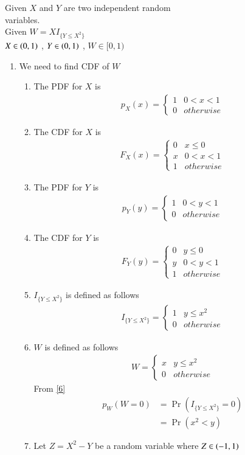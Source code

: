 \documentclass[journal,12pt,twocolumn]{IEEEtran}
\begin{document}
Given $X$ and $Y$ are two independent random\\
variables. \\
Given $W=XI_{\{Y\leq X^2\}}$ \\
$X \in \left(0,1\right)$ , $Y \in \left(0,1\right)$ , $W \in [0,1)$\\
\begin{enumerate}
\item We need to find CDF of $W$
\begin{enumerate}
\item The PDF for $X$ is
\begin{align}
p_X(x) = 
\begin{cases}
     1 & 0 < x  < 1 \\
     0 & otherwise 
\end{cases}\label{1}
\end{align}
\item The CDF for $X$ is
\begin{align}
F_{X}(x)  = 
\begin{cases}
      0 & x \leq 0 \\
      x & 0 < x < 1 \\
      1 & otherwise
\end{cases}  \label{eq:2}
\end{align}
\item The PDF for $Y$ is
\begin{align}
p_{Y}(y)  = 
\begin{cases}
      1 & 0 < y < 1 \\
      0 & otherwise 
\end{cases} \label{3}
\end{align}
\item The CDF for $Y$ is
\begin{align}
F_{Y}(y)  = 
\begin{cases}
      0 & y \leq 0 \\
      y & 0 < y < 1 \\
      1 & otherwise 
\end{cases}\label{4}
\end{align}
\item $I_{\{Y\leq X^2\}}$ is defined as follows
\begin{align} 
I_{\{Y\leq X^2\}} =
\begin{cases}
    1 & y \leq x^2  \\
    0 & otherwise 
\end{cases} \label{5}
\end{align}
\item $W$ is defined as follows
\begin{align}
W  = 
\begin{cases}
    x & y \leq x^2 \\
    0 & otherwise
\end{cases}  \label{6}
\end{align}
From \eqref{6}
\begin{align}
p_W(W=0) &= \Pr(I_{\{Y\leq X^2\}}=0) \\
         &=\Pr(x^2 <y) \label{7}
\end{align}
\item Let $Z=X^2-Y$ be a random variable where $Z \in \left(-1,1\right)$


\end{enumerate}
\end{enumerate}
\end{document}
